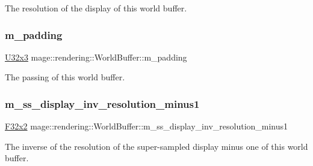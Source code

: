 The resolution of the display of this world buffer. \hypertarget{structmage_1_1rendering_1_1_world_buffer_abd57dceab6a7f9626b4b357494165e7c}{}\label{structmage_1_1rendering_1_1_world_buffer_abd57dceab6a7f9626b4b357494165e7c} 
\subsubsection{\texorpdfstring{m\+\_\+padding}{m\_padding}}
{\footnotesize\ttfamily \hyperlink{namespacemage_ab3633c193f686845fcf80ce95d18a20b}{U32x3} mage\+::rendering\+::\+World\+Buffer\+::m\+\_\+padding}

The passing of this world buffer. \hypertarget{structmage_1_1rendering_1_1_world_buffer_a0b4e2ea6d206d02bb40e8f3571d95bf8}{}\label{structmage_1_1rendering_1_1_world_buffer_a0b4e2ea6d206d02bb40e8f3571d95bf8} 
\subsubsection{\texorpdfstring{m\+\_\+ss\+\_\+display\+\_\+inv\+\_\+resolution\+\_\+minus1}{m\_ss\_display\_inv\_resolution\_minus1}}
{\footnotesize\ttfamily \hyperlink{namespacemage_aa87237ad091f5cd7da612b8523fc108f}{F32x2} mage\+::rendering\+::\+World\+Buffer\+::m\+\_\+ss\+\_\+display\+\_\+inv\+\_\+resolution\+\_\+minus1}

The inverse of the resolution of the super-\/sampled display minus one of this world buffer. \hypertarget{structmage_1_1rendering_1_1_world_buffer_a76def4c6b834b74a9505464d5f6192e5}{}\label{structmage_1_1rendering_1_1_world_buffer_a76def4c6b834b74a9505464d5f6192e5} 
